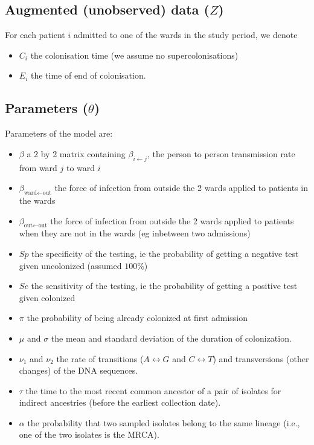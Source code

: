 \documentclass[10pt]{article}
\begin{document}
\subsection*{Augmented (unobserved) data ($Z$)}

For each patient $i$ admitted to one of the wards in the study period, we denote 
\begin{itemize}
	\item $C_i$ the colonisation time (we assume no supercolonisations)
	\item $E_i$ the time of end of colonisation.
\end{itemize}

\subsection*{Parameters ($\theta$)}

Parameters of the model are: 
\begin{itemize}
	\item $\beta$ a 2 by 2 matrix containing $\beta_{i \leftarrow j}$, the person to person transmission rate from ward $j$ to ward $i$
	\item $\beta_{\text{ward} \leftarrow \text{out}}$ the force of infection from outside the 2 wards applied to patients in the wards
	\item $\beta_{\text{out} \leftarrow \text{out}}$ the force of infection from outside the 2 wards applied to patients when they are not in the wards (eg inbetween two admissions)
	\item $Sp$ the specificity of the testing, ie the probability of getting a negative test given uncolonized (assumed $100\%$)
	\item $Se$ the sensitivity of the testing, ie the probability of getting a positive test given colonized
	\item $\pi$ the probability of being already colonized at first admission
	\item $\mu$ and $\sigma$ the mean and standard deviation of the duration of colonization.
	\item $\nu_1$ and $\nu_2$ the rate of transitions ($A \leftrightarrow G$ and $C \leftrightarrow T$) and transversions (other changes) of the DNA sequences.
	\item $\tau$ the time to the most recent common ancestor of a pair of isolates for indirect ancestries (before the earliest collection date).
	\item $\alpha$ the probability that two sampled isolates belong to the same lineage (i.e., one of the two isolates is the MRCA).
\end{itemize}
\end{document}
